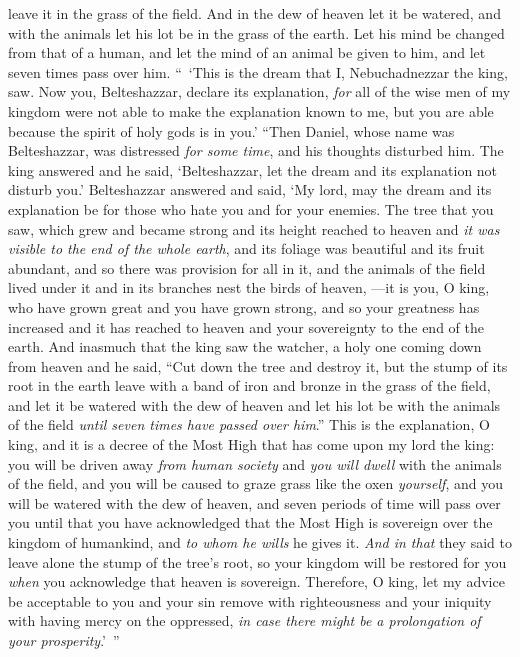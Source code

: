 \begin{biblechapter}
leave it in the grass of the field. 
And in the dew of heaven 
let it be watered, 
and with the animals 
let his lot be in the grass of the earth.
\verse Let his mind be changed from that of a human, 
and let the mind of an animal be given to him, 
and let seven times pass over him.
\verse “ ‘This is the dream that I, Nebuchadnezzar the king, saw. Now you, Belteshazzar, declare its explanation, \textit{for} all of the wise men of my kingdom were not able to make the explanation known to me, but you are able because the spirit of holy gods is in you.’
 “Then Daniel, whose name was Belteshazzar, was distressed \textit{for some time}, and his thoughts disturbed him. The king answered and he said, ‘Belteshazzar, let the dream and its explanation not disturb you.’ Belteshazzar answered and said, ‘My lord, may the dream and its explanation be for those who hate you and for your enemies.
\verse The tree that you saw, which grew and became strong and its height reached to heaven and \textit{it was visible to the end of the whole earth},
\verse and its foliage was beautiful and its fruit abundant, and so there was provision for all in it, and the animals of the field lived under it and in its branches nest the birds of heaven,
\verse —it is you, O king, who have grown great and you have grown strong, and so your greatness has increased and it has reached to heaven and your sovereignty to the end of the earth.
\verse And inasmuch that the king saw the watcher, a holy one coming down from heaven and he said, “Cut down the tree and destroy it, but the stump of its root in the earth leave with a band of iron and bronze in the grass of the field, and let it be watered with the dew of heaven and let his lot be with the animals of the field \textit{until seven times have passed over him}.”
\verse This is the explanation, O king, and it is a decree of the Most High that has come upon my lord the king:
\verse you will be driven away \textit{from human society} and \textit{you will dwell} with the animals of the field, and you will be caused to graze grass like the oxen \textit{yourself}, and you will be watered with the dew of heaven, and seven periods of time will pass over you until that you have acknowledged that the Most High is sovereign over the kingdom of humankind, and \textit{to whom he wills} he gives it.
\verse \textit{And in that} they said to leave alone the stump of the tree’s root, so your kingdom will be restored for you \textit{when} you acknowledge that heaven is sovereign.
\verse Therefore, O king, let my advice be acceptable to you and your sin remove with righteousness and your iniquity with having mercy on the oppressed, \textit{in case there might be a prolongation of your prosperity}.’ ”

\end{biblechapter}
